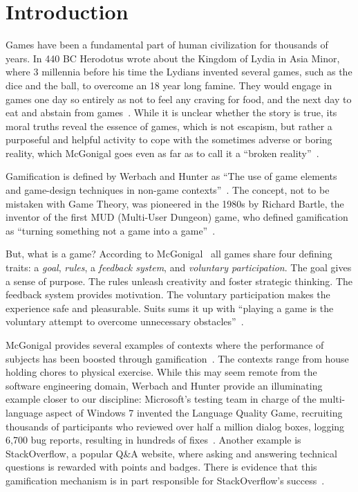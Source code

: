 \section{Introduction}

Games have been a fundamental part of human civilization for thousands of years.
In 440 BC Herodotus wrote about the Kingdom of Lydia in Asia Minor, where 3 millennia before his time the Lydians invented several games, such as the dice and the ball, to overcome an 18 year long famine.
They would engage in games one day so entirely as not to feel any craving for food, and the next day to eat and abstain from games~\cite{Hero440a}.
 While it is unclear whether the story is true, its moral truths reveal the essence of games, which is not escapism, but rather a purposeful and helpful activity to cope with the sometimes adverse or boring reality, which McGonigal goes even as far as to call it a ``broken reality''~\cite{McGo2011a}.

 Gamification is defined by Werbach and Hunter as ``The use of game elements and game-design techniques in non-game contexts''~\cite{Werb2012a}.
The concept, not to be mistaken with Game Theory, was pioneered in the 1980s by Richard Bartle, the inventor of the first MUD (Multi-User Dungeon) game, who defined gamification as ``turning something not a game into a game''~\cite{Bart2003a}.

But, what is a game? According to McGonigal~\cite{McGo2011a} all games share four defining traits: a \emph{goal}, \emph{rules}, a \emph{feedback system}, and \emph{voluntary participation}.
The goal gives a sense of purpose.
The rules unleash creativity and foster strategic thinking.
The feedback system provides motivation.
The voluntary participation makes the experience safe and pleasurable.
Suits sums it up with ``playing a game is the voluntary attempt to overcome unnecessary obstacles''~\cite{Suit2005a}.

McGonigal provides several examples of contexts where the performance of subjects has been boosted through gamification~\cite{McGo2011a}.
The contexts range from house holding chores to physical exercise.
While this may seem remote from the software engineering domain, Werbach and Hunter provide an illuminating example closer to our discipline: Microsoft's testing team in charge of the multi-language aspect of Windows 7 invented the Language Quality Game, recruiting thousands of participants who reviewed over half a million dialog boxes, logging 6,700 bug reports, resulting in hundreds of fixes~\cite{Werb2012a}.
Another example is StackOverflow, a popular Q\&A website, where asking and answering technical questions is rewarded with points and badges.
There is evidence that this gamification mechanism is in part responsible for StackOverflow's success~\cite{Vasil2013a}.

